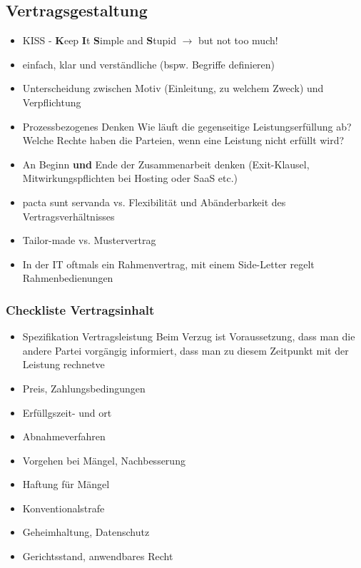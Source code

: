 \documentclass{report}
\theoremstyle{definition}
\theoremstyle{example}
\begin{document}
\subsection{Vertragsgestaltung}
\begin{itemize}
   \item KISS - \textbf{K}eep \textbf{I}t \textbf{S}imple and \textbf{S}tupid $\rightarrow$ but not too much!
   \item einfach, klar und verständliche (bspw. Begriffe definieren)
   \item Unterscheidung zwischen Motiv (Einleitung, zu welchem Zweck) und Verpflichtung
   \item Prozessbezogenes Denken
   \subitem Wie läuft die gegenseitige Leistungserfüllung ab?
   \subitem Welche Rechte haben die Parteien, wenn eine Leistung nicht erfüllt wird? 
   \item An Beginn \textbf{und} Ende der Zusammenarbeit denken (Exit-Klausel, Mitwirkungspflichten bei Hosting oder SaaS etc.)
   \item pacta sunt servanda vs. Flexibilität und Abänderbarkeit des Vertragsverhältnisses
   \item Tailor-made vs. Mustervertrag
   \item In der IT oftmals ein Rahmenvertrag, mit einem Side-Letter 
   \subitem regelt Rahmenbedienungen 
\end{itemize}

\subsubsection{Checkliste Vertragsinhalt}
\begin{itemize}
   \item Spezifikation Vertragsleistung
   \subitem Beim Verzug ist Voraussetzung, dass man die andere Partei vorgängig informiert, dass man zu diesem Zeitpunkt mit der Leistung rechnetve 
   \item Preis, Zahlungsbedingungen
   \item Erfüllgszeit- und ort
   \item Abnahmeverfahren
   \item Vorgehen bei Mängel, Nachbesserung
   \item Haftung für Mängel
   \item Konventionalstrafe
   \item Geheimhaltung, Datenschutz
   \item Gerichtsstand, anwendbares Recht
\end{itemize}
\end{document}
